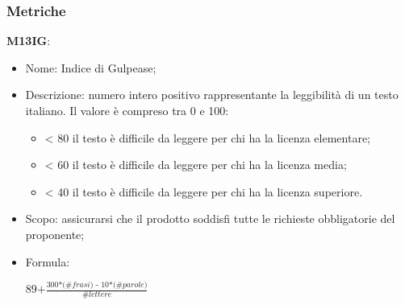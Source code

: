 \subsubsection{Metriche}
\textbf{M13IG}:
    \begin{itemize}
      \item Nome: Indice di Gulpease;
      \item Descrizione: numero intero positivo rappresentante la leggibilità di un testo italiano. Il valore è compreso tra 0 e 100:
           \begin{itemize}
                \item < 80 il testo è difficile da leggere per chi ha la licenza elementare;
                \item < 60 il testo è difficile da leggere per chi ha la licenza media;
                \item < 40 il testo è difficile da leggere per chi ha la licenza superiore.
           \end{itemize}
      \item Scopo: assicurarsi che il prodotto soddisfi tutte le richieste obbligatorie del proponente;
      \item Formula:
      \begin{center}
        $ \textit{89+}\frac{\textit{300*(\#frasi) - 10*(\#parole)}}{\textit{\#lettere}}$
      \end{center}
\end{itemize}